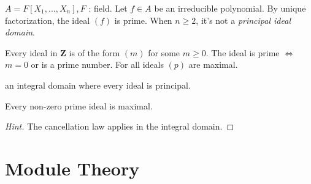 \documentclass[11pt,fleqn]{book} %
\begin{document}
\begin{CJK}{UTF8}{gkai}
\begin{example}
	$A = F[X_1,...,X_n], F$ : field. Let $f \in A$ be an irreducible polynomial. By unique factorization, the ideal $(f)$ is prime. When $n \geq 2$, it's not a {\it principal ideal domain}.	
\end{example}

\begin{example}
	Every ideal in $\mathbf{Z}$ is of the form $(m)$ for some $m \geq 0$. The ideal is prime $\iff$ $m = 0$ or is a prime number. For all ideals $(p)$ are maximal.
\end{example}

\begin{definition}
	 an integral domain where every ideal is principal.
\end{definition}

\begin{proposition}
	Every non-zero prime ideal is maximal.
\end{proposition}
\begin{proof}
	[Hint] The cancellation law applies in the integral domain.
\end{proof}

\chapter{Module Theory}

\end{CJK}
\end{document}
